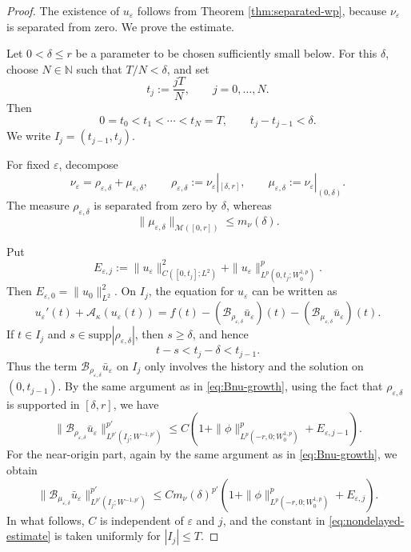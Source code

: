 \documentclass[a4paper,11pt,oneside,reqno]{amsart}
\newcounter{c}
\newcounter{d}
\newcounter{b}
\newcommand{\e}{\varepsilon}
\newcommand{\supp}{\mathrm{supp}}
\newcommand{\M}{\mathcal{M}}
\begin{document}
\begin{proof}
The existence of \(u_\e\) follows from Theorem
\ref{thm:separated-wp}, because \(\nu_\e\) is separated from zero.
We prove the estimate.

Let \(0<\delta\le r\) be a parameter to be chosen sufficiently small below.
For this \(\delta\), choose \(N\in\mathbb N\) such that \(T/N<\delta\), and set
\[
 t_j:=\frac{jT}{N},\qquad j=0,\dots,N.
\]
Then
\[
 0=t_0<t_1<\cdots<t_N=T,
 \qquad
 t_j-t_{j-1}<\delta .
\]
We write \(I_j=(t_{j-1},t_j)\).

For fixed \(\e\), decompose
\[
 \nu_\e
 =
 \rho_{\e,\delta}
 +
 \mu_{\e,\delta},
 \qquad
 \rho_{\e,\delta}:=\nu_\e|_{[\delta,r]},
 \qquad
 \mu_{\e,\delta}:=\nu_\e|_{(0,\delta)} .
\]
The measure \(\rho_{\e,\delta}\) is separated from zero by \(\delta\), whereas
\[
 \|\mu_{\e,\delta}\|_{\M([0,r])}
 \le m_\nu(\delta).
\]

Put
\[
 E_{\e,j}:=
 \|u_\e\|_{C([0,t_j];L^2)}^2
 +
 \|u_\e\|_{L^p(0,t_j;W^{1,p}_0)}^p .
\]
Then \(E_{\e,0}=\|u_0\|_{L^2}^2\).  On \(I_j\), the equation for
\(u_\e\) can be written as
\[
 u_\e'(t)+\mathcal A_\kappa(u_\e(t))
 =
 f(t)
 -(\mathcal B_{\rho_{\e,\delta}}\bar u_\e)(t)
 -(\mathcal B_{\mu_{\e,\delta}}\bar u_\e)(t).
\]
If \(t\in I_j\) and \(s\in\supp|\rho_{\e,\delta}|\), then
\(s\ge\delta\), and hence
\[
 t-s<t_j-\delta<t_{j-1}.
\]
Thus the term \(\mathcal B_{\rho_{\e,\delta}}\bar u_\e\) on \(I_j\) only
involves the history and the solution on \((0,t_{j-1})\). By the same
argument as in \eqref{eq:Bnu-growth}, using the fact that
\(\rho_{\e,\delta}\) is supported in \([\delta,r]\), we have
\[
 \|\mathcal B_{\rho_{\e,\delta}}\bar u_\e
 \|_{L^{p'}(I_j;W^{-1,p'})}^{p'}
 \le
 C\left(
 1+\|\phi\|_{L^p(-r,0;W^{1,p}_0)}^p
 +E_{\e,j-1}
 \right).
\]
For the near-origin part, again by the same argument as in
\eqref{eq:Bnu-growth}, we obtain
\[
 \|\mathcal B_{\mu_{\e,\delta}}\bar u_\e
 \|_{L^{p'}(I_j;W^{-1,p'})}^{p'}
 \le
 C m_\nu(\delta)^{p'}
 \left(
 1+\|\phi\|_{L^p(-r,0;W^{1,p}_0)}^p
 +E_{\e,j}
 \right).
\]
In what follows, \(C\) is independent of \(\e\) and \(j\), and the constant
in \eqref{eq:nondelayed-estimate} is taken uniformly for \(|I_j|\le T\).


\end{proof}
\end{document}

